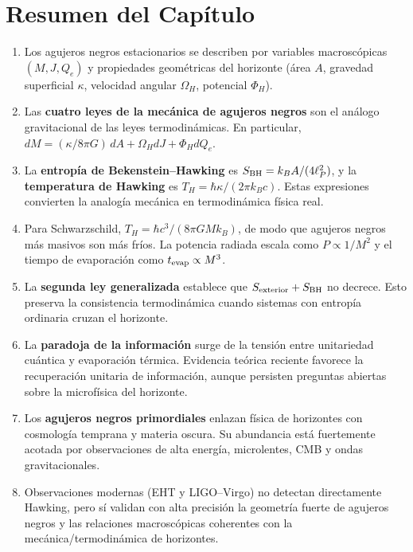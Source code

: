 \section{Resumen del Capítulo}
\label{sec:resumen_cap9}

\begin{enumerate}[leftmargin=2em, label=\textbf{\arabic*.}]

  \item Los agujeros negros estacionarios se describen por variables macroscópicas $(M,J,Q_e)$ y propiedades geométricas del horizonte (área $A$, gravedad superficial $\kappa$, velocidad angular $\Omega_H$, potencial $\Phi_H$).

  \item Las \textbf{cuatro leyes de la mecánica de agujeros negros} son el análogo gravitacional de las leyes termodinámicas. En particular,
  \(dM = (\kappa/8\pi G)\,dA + \Omega_H dJ + \Phi_H dQ_e\).

  \item La \textbf{entropía de Bekenstein--Hawking} es
  \(S_{\rm BH} = k_B A/(4\ell_P^2)\),
  y la \textbf{temperatura de Hawking} es
  \(T_H = \hbar\kappa/(2\pi k_B c)\).
  Estas expresiones convierten la analogía mecánica en termodinámica física real.

  \item Para Schwarzschild,
  \(T_H = \hbar c^3/(8\pi GMk_B)\),
  de modo que agujeros negros más masivos son más fríos. La potencia radiada escala como $P\propto 1/M^2$ y el tiempo de evaporación como $t_{\rm evap}\propto M^3$.

  \item La \textbf{segunda ley generalizada} establece que
  \(S_{\rm exterior}+S_{\rm BH}\)
  no decrece. Esto preserva la consistencia termodinámica cuando sistemas con entropía ordinaria cruzan el horizonte.

  \item La \textbf{paradoja de la información} surge de la tensión entre unitariedad cuántica y evaporación térmica. Evidencia teórica reciente favorece la recuperación unitaria de información, aunque persisten preguntas abiertas sobre la microfísica del horizonte.

  \item Los \textbf{agujeros negros primordiales} enlazan física de horizontes con cosmología temprana y materia oscura. Su abundancia está fuertemente acotada por observaciones de alta energía, microlentes, CMB y ondas gravitacionales.

  \item Observaciones modernas (EHT y LIGO--Virgo) no detectan directamente Hawking, pero sí validan con alta precisión la geometría fuerte de agujeros negros y las relaciones macroscópicas coherentes con la mecánica/termodinámica de horizontes.

\end{enumerate}

